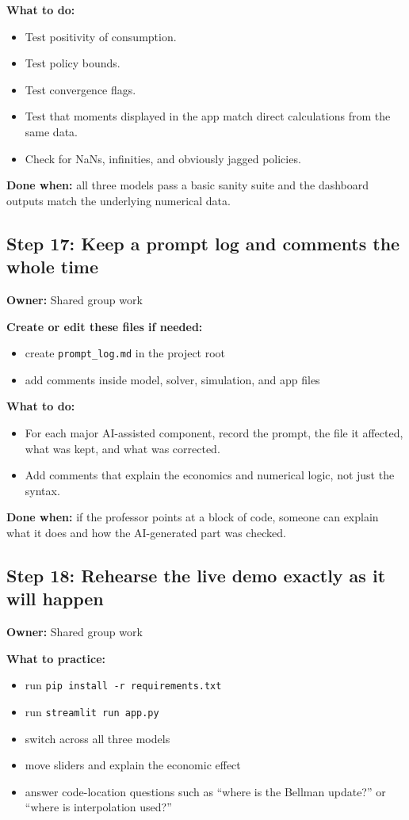 \documentclass[11pt]{article}
\begin{document}
\textbf{What to do:}
\begin{itemize}
    \item Test positivity of consumption.
    \item Test policy bounds.
    \item Test convergence flags.
    \item Test that moments displayed in the app match direct calculations from the same data.
    \item Check for NaNs, infinities, and obviously jagged policies.
\end{itemize}

\textbf{Done when:} all three models pass a basic sanity suite and the dashboard outputs match the underlying numerical data.

\subsection{Step 17: Keep a prompt log and comments the whole time}
\textbf{Owner:} Shared group work

\textbf{Create or edit these files if needed:}
\begin{itemize}
    \item create \texttt{prompt\_log.md} in the project root
    \item add comments inside model, solver, simulation, and app files
\end{itemize}

\textbf{What to do:}
\begin{itemize}
    \item For each major AI-assisted component, record the prompt, the file it affected, what was kept, and what was corrected.
    \item Add comments that explain the economics and numerical logic, not just the syntax.
\end{itemize}

\textbf{Done when:} if the professor points at a block of code, someone can explain what it does and how the AI-generated part was checked.

\subsection{Step 18: Rehearse the live demo exactly as it will happen}
\textbf{Owner:} Shared group work

\textbf{What to practice:}
\begin{itemize}
    \item run \texttt{pip install -r requirements.txt}
    \item run \texttt{streamlit run app.py}
    \item switch across all three models
    \item move sliders and explain the economic effect
    \item answer code-location questions such as ``where is the Bellman update?'' or ``where is interpolation used?''
\end{itemize}
\end{document}
